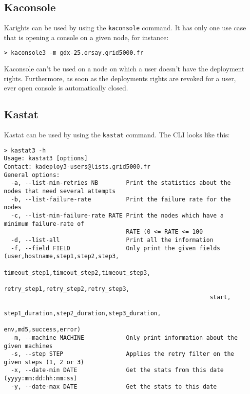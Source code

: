 \documentclass[a4wide,10pt,oneside]{book}
\begin{document}
\subsection{Kaconsole}\label{sec:kaconsole}
Karights can be used by using the \texttt{kaconsole} command. It has only one use case that is opening a console on a given node, for instance:
\begin{verbatim}
> kaconsole3 -m gdx-25.orsay.grid5000.fr
\end{verbatim}

Kaconsole can't be used on a node on which a user doesn't have the deployment rights. Furthermore, as soon as the deployments rights are revoked for a user, ever open console is automatically closed.

\subsection{Kastat}\label{sec:kastat}
Kastat can be used by using the \texttt{kastat} command. The CLI looks like this:
\begin{small}
\begin{verbatim}
> kastat3 -h
Usage: kastat3 [options]
Contact: kadeploy3-users@lists.grid5000.fr
General options:
  -a, --list-min-retries NB        Print the statistics about the nodes that need several attempts
  -b, --list-failure-rate          Print the failure rate for the nodes
  -c, --list-min-failure-rate RATE Print the nodes which have a minimum failure-rate of 
                                   RATE (0 <= RATE <= 100
  -d, --list-all                   Print all the information
  -f, --field FIELD                Only print the given fields (user,hostname,step1,step2,step3,
                                                           timeout_step1,timeout_step2,timeout_step3,
                                                           retry_step1,retry_step2,retry_step3,
                                                           start,
                                                           step1_duration,step2_duration,step3_duration,
                                                           env,md5,success,error)
  -m, --machine MACHINE            Only print information about the given machines
  -s, --step STEP                  Applies the retry filter on the given steps (1, 2 or 3)
  -x, --date-min DATE              Get the stats from this date (yyyy:mm:dd:hh:mm:ss)
  -y, --date-max DATE              Get the stats to this date
\end{verbatim}
\end{small}
\end{document}
